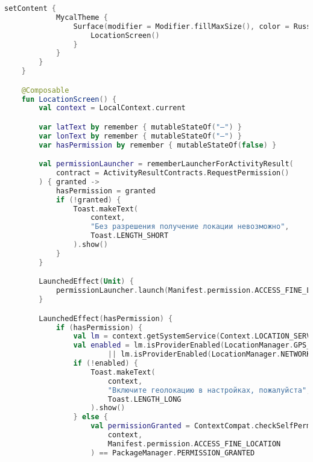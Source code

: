 \begin{lstlisting}[language=Kotlin, caption=MapPage.kt]
        setContent {
            MycalTheme {
                Surface(modifier = Modifier.fillMaxSize(), color = Russian_Violete) {
                    LocationScreen()
                }
            }
        }
    }

    @Composable
    fun LocationScreen() {
        val context = LocalContext.current

        var latText by remember { mutableStateOf("—") }
        var lonText by remember { mutableStateOf("—") }
        var hasPermission by remember { mutableStateOf(false) }

        val permissionLauncher = rememberLauncherForActivityResult(
            contract = ActivityResultContracts.RequestPermission()
        ) { granted ->
            hasPermission = granted
            if (!granted) {
                Toast.makeText(
                    context,
                    "Без разрешения получение локации невозможно",
                    Toast.LENGTH_SHORT
                ).show()
            }
        }

        LaunchedEffect(Unit) {
            permissionLauncher.launch(Manifest.permission.ACCESS_FINE_LOCATION)
        }

        LaunchedEffect(hasPermission) {
            if (hasPermission) {
                val lm = context.getSystemService(Context.LOCATION_SERVICE) as LocationManager
                val enabled = lm.isProviderEnabled(LocationManager.GPS_PROVIDER)
                        || lm.isProviderEnabled(LocationManager.NETWORK_PROVIDER)
                if (!enabled) {
                    Toast.makeText(
                        context,
                        "Включите геолокацию в настройках, пожалуйста",
                        Toast.LENGTH_LONG
                    ).show()
                } else {
                    val permissionGranted = ContextCompat.checkSelfPermission(
                        context,
                        Manifest.permission.ACCESS_FINE_LOCATION
                    ) == PackageManager.PERMISSION_GRANTED


\end{lstlisting}
